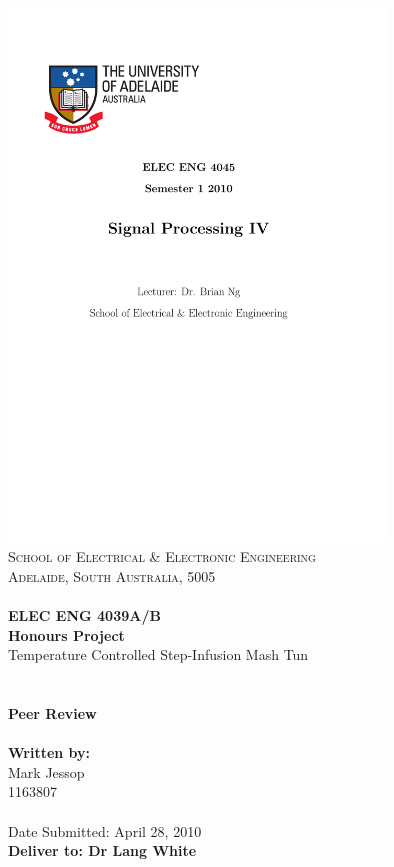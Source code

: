 \documentclass[a4paper,12pt]{article}
\begin{document}
\thispagestyle{empty}
\vspace*{\fill}
\includegraphics[width=10cm]{./UofAlogo.pdf}\\
\noindent
\textsc{
\textsc{School of Electrical \& Electronic Engineering}\\
Adelaide, South Australia, 5005\\ \\
}
\noindent
\Large{\textbf{
ELEC ENG 4039A/B \\
Honours Project\\
	}}
	\Large{
		Temperature Controlled Step-Infusion Mash Tun \\
	}
	\small{\textbf{}}
	\ \\
	\ \\
	\Large{\textbf{
		Peer Review \\
	}}
	\ \\
	\small{\textbf{
		Written by: \\}
		Mark Jessop \\
		1163807
	}
	\ \\
	\ \\
	Date Submitted: April 28, 2010 \\
	\textbf{Deliver to: Dr Lang White}\\
 \vspace*{\fill}
\end{document}
